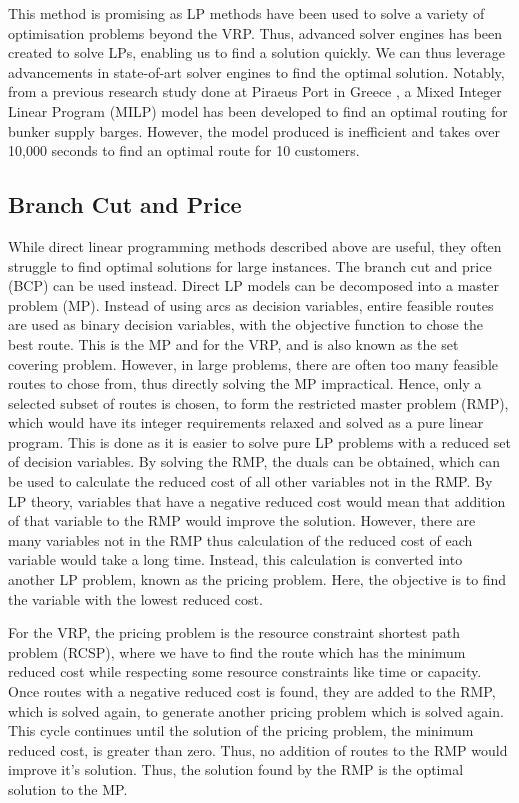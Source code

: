 This method is promising as LP methods have been used to solve a variety of optimisation problems beyond the VRP. Thus, advanced solver engines has been created to solve LPs, enabling us to find a solution quickly. We can thus leverage advancements in state-of-art solver engines to find the optimal solution. Notably, from a previous research study done at Piraeus Port in Greece \cite{corman_decision_2015}, a Mixed Integer Linear Program (MILP) model has been developed to find an optimal routing for bunker supply barges. However, the model produced is inefficient and takes over 10,000 seconds to find an optimal route for 10 customers.

\subsection{Branch Cut and Price}
While direct linear programming methods described above are useful, they often struggle to find optimal solutions for large instances. The branch cut and price (BCP) can be used instead. Direct LP models can be decomposed into a master problem (MP). Instead of using arcs as decision variables, entire feasible routes are used as binary decision variables, with the objective function to chose the best route. This is the MP and for the VRP, and is also known as the set covering problem. However, in large problems, there are often too many feasible routes to chose from, thus directly solving the MP impractical. Hence, only a selected subset of routes is chosen, to form the restricted master problem (RMP), which would have its integer requirements relaxed and solved as a pure linear program. This is done as it is easier to solve pure LP problems with a reduced set of decision variables. By solving the RMP, the duals can be obtained, which can be used to calculate the reduced cost of all other variables not in the RMP. By LP theory, variables that have a negative reduced cost would mean that addition of that variable to the RMP would improve the solution. However, there are many variables not in the RMP thus calculation of the reduced cost of each variable would take a long time. Instead, this calculation is converted into another LP problem, known as the pricing problem. Here, the objective is to find the variable with the lowest reduced cost. 

For the VRP, the pricing problem is the resource constraint shortest path problem (RCSP), where we have to find the route which has the minimum reduced cost while respecting some resource constraints like time or capacity. Once routes with a negative reduced cost is found, they are added to the RMP, which is solved again, to generate another pricing problem which is solved again. This cycle continues until the solution of the pricing problem, the minimum reduced cost, is greater than zero. Thus, no addition of routes to the RMP would improve it's solution. Thus, the solution found by the RMP is the optimal solution to the MP. 

